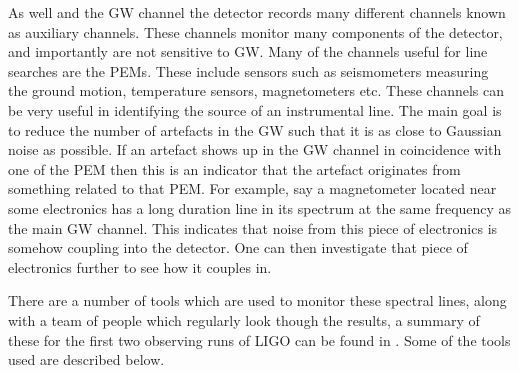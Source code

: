 %
As well and the \gls{GW} channel the detector records many different channels known as auxiliary channels. 
These channels monitor many components of the detector, and importantly are not sensitive to \gls{GW}.
Many of the channels useful for line searches are the \glspl{PEM}.
These include sensors such as seismometers measuring the ground motion, temperature sensors, magnetometers etc. 
These channels can be very useful in identifying the source of an instrumental line.
The main goal is to reduce the number of artefacts in the \gls{GW} such that it is as close to Gaussian noise as possible.
If an artefact shows up in the \gls{GW} channel in coincidence with one of the \gls{PEM} then this is an indicator that the artefact originates from something related to that \gls{PEM}.
For example, say a magnetometer located near some electronics has a long duration line in its spectrum at the same frequency as the main \gls{GW} channel. 
This indicates that noise from this piece of electronics is somehow coupling into the detector. 
One can then investigate that piece of electronics further to see how it couples in.

%

There are a number of tools which are used to monitor these spectral lines, along with a team of people which regularly look though the results, a summary of these for the first two observing runs of \gls{LIGO} can be found in \citep{covas2018IdentificationMitigation}.
Some of the tools used are described below. 


